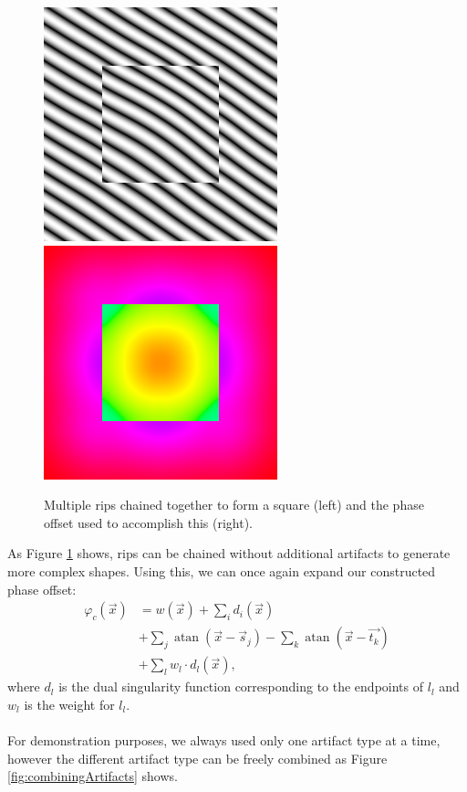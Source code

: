 \documentclass{utue} %
\DeclareMathOperator{\atan}{atan}
\begin{document}
\begin{figure}[ht]
  \centering
  \includegraphics[width=0.49\linewidth]{images/ripChaining}
  \includegraphics[width=0.49\linewidth]{images/ripChainingPhase}
  \caption{Multiple rips chained together to form a square (left) and the phase offset used to accomplish this (right).}\label{fig:ripChaining}
\end{figure}

As Figure \ref{fig:ripChaining} shows, rips can be chained without additional artifacts to generate more complex shapes. Using this, we can once again expand our constructed phase offset:
\begin{align*}
  \varphi_c(\vec{x})&=w(\vec{x}) +\sum_i d_i(\vec{x})\\
  & + \sum_j \atan(\vec{x}-\vec{s}_j) - \sum_k \atan(\vec{x}-\vec{t_k})\\
  & + \sum_l w_l\cdot d_l(\vec{x}),
\end{align*}
where $d_l$ is the dual singularity function corresponding to the endpoints of $l_l$ and $w_l$ is the weight for $l_l$.\\
\\
For demonstration purposes, we always used only one artifact type at a time, however the different artifact type can be freely combined as Figure \ref{fig:combiningArtifacts} shows.
\end{document}
